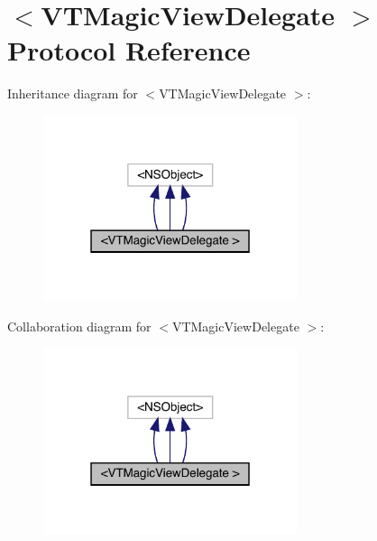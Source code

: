 \hypertarget{protocol_v_t_magic_view_delegate_01-p}{}\section{$<$V\+T\+Magic\+View\+Delegate $>$ Protocol Reference}
\label{protocol_v_t_magic_view_delegate_01-p}


Inheritance diagram for $<$V\+T\+Magic\+View\+Delegate $>$\+:\nopagebreak
\begin{figure}[H]
\begin{center}
\leavevmode
\includegraphics[width=211pt]{protocol_v_t_magic_view_delegate_01-p__inherit__graph}
\end{center}
\end{figure}


Collaboration diagram for $<$V\+T\+Magic\+View\+Delegate $>$\+:\nopagebreak
\begin{figure}[H]
\begin{center}
\leavevmode
\includegraphics[width=211pt]{protocol_v_t_magic_view_delegate_01-p__coll__graph}
\end{center}
\end{figure}

